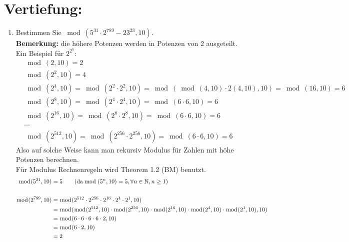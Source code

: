 



	\maketitle
	\section*{Vertiefung:}
	\begin{enumerate}[label=(\alph*)]
		\item  Bestimmen Sie $ \bmod(5^{31} \cdot 2^{789}-23^{23}, 10) $. \\
		\textbf{Bemerkung:} die h\"ohere Potenzen werden in Potenzen von 2 ausgeteilt.\\ Ein Beispiel f\"ur $2^{2^n}$:
		\begin{align*}
			&\bmod(2,10)=2\\
			&\bmod(2^2,10)=4\\
			&\bmod(2^4,10)=\bmod(2^2\cdot2^2,10)=\bmod(\bmod(4,10)\cdot2(4,10),10)=\bmod(16,10)=6\\
			&\bmod(2^8,10)=\bmod(2^4\cdot2^4,10)=\bmod(6\cdot6,10)=6\\
			&\bmod(2^{16},10)=\bmod(2^8\cdot2^8,10)=\bmod(6\cdot6,10)=6\\
			&\cdots \\
			&\bmod(2^{512},10)=\bmod(2^{256}\cdot2^{256},10)=\bmod(6\cdot6,10)=6
		\end{align*}
		Also auf solche Weise kann man rekursiv Modulus f\"ur Zahlen mit h\"ohe Potenzen berechnen.\\
		F\"ur Modulus Rechnenregeln wird Theorem 1.2 (BM) benutzt. 
		\begin{align*}
			\bmod(5^{31},10) &= 5  \textrm{\qquad (da} \bmod(5^n,10)=5, \forall n \in \mathbb{N}, n\geq1) \\\\
			\bmod(2^{789},10) &= \bmod(2^{512}\cdot2^{256}\cdot2^{16}\cdot2^4\cdot2^1,10) 
			\\&= \bmod(\bmod(2^{512},10)\cdot\bmod(2^{256},10)\cdot\bmod(2^{16},10)\cdot\bmod(2^4,10)\cdot\bmod(2^1,10),10)
			\\&= \bmod(6\cdot 6\cdot 6\cdot 6\cdot 2, 10)
			\\&= \bmod(6\cdot2,10) 
			\\&= 2 \\\\

\end{align*}
\end{enumerate}
